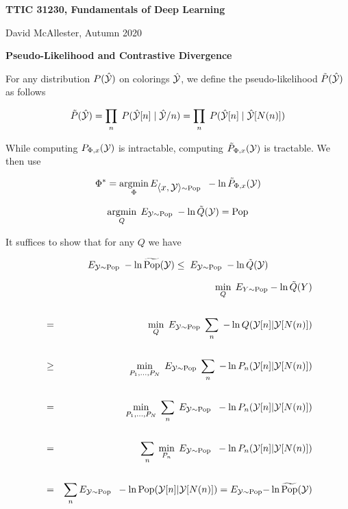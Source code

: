 




{\Huge

  \centerline{\bf TTIC 31230, Fundamentals of Deep Learning}
  \bigskip
  \centerline{David McAllester, Autumn 2020}
  \vfill
  \vfill
  \centerline{\bf Pseudo-Likelihood and Contrastive Divergence}
\vfill
\vfill
\vfill


For any distribution $P(\hat{\cal Y})$ on colorings $\hat{\cal Y}$,
we define the {\color{red} pseudo-likelihood}  $\tilde{P}(\hat{\cal Y})$ as follows

{\color{red} $$\tilde{P}(\hat{\cal Y}) = \prod_n\;P(\hat{\cal Y}[n]\;|\; \hat{\cal Y}/n) = \prod_n\;P(\hat{\cal Y}[n]\;|\; \hat{\cal Y}[N(n)])$$}

\vfill
While computing $P_{\Phi,x}({\cal Y})$ is intractable, computing $\tilde{P}_{\Phi,x}({\cal Y})$ is tractable.  We then use

{\color{red} $$\Phi^* = \operatorname*{argmin}_\Phi E_{{\mbox{$\langle x,{\cal Y}\rangle$}} \sim \mathrm{Pop}}\;\;-\ln \tilde{P}_{\Phi,x}({\cal Y})$$}


{\color{red} $$\operatorname*{argmin}_Q \; E_{{\cal Y} \sim \mathrm{Pop}} \;-\ln \tilde{Q}({\cal Y}) = \mathrm{Pop}$$}

\vfill
It suffices to show that for any $Q$ we have

\vfill
$$ E_{{\cal Y} \sim \mathrm{Pop}}\;-\ln \widetilde{\mathrm{Pop}}({\cal Y}) \leq \;E_{{\cal Y} \sim \mathrm{Pop}}\;-\ln \tilde{Q}({\cal Y})$$


{\huge
\begin{eqnarray*}
  & & \min_Q \;E_{Y\sim \mathrm{Pop}} -\ln \tilde{Q}(Y) \\
  \\
  & = & \min_Q \;E_{{\cal Y}\sim \mathrm{Pop}} \;\sum_n\;-\ln Q({\cal Y}[n]|{\cal Y}[N(n)]) \\
  \\
  & \geq & \min_{P_1,\ldots,P_N} \;E_{{\cal Y}\sim \mathrm{Pop}} \;\sum_n\;-\ln P_n({\cal Y}[n]|{\cal Y}[N(n)]) \\
  \\
  & = & \min_{P_1,\ldots,P_N} \;\sum_n \;E_{{\cal Y} \sim \mathrm{Pop}}\;\; -\ln P_n({\cal Y}[n]|{\cal Y}[N(n)]) \\
  \\          
  & = & \sum_n \;\min_{P_n}\;E_{{\cal Y} \sim \mathrm{Pop}}\;\; -\ln P_n({\cal Y}[n]|{\cal Y}[N(n)]) \\
  \\
    & = & \sum_n E_{{\cal Y} \sim \mathrm{Pop}}\;\; -\ln \mathrm{Pop}({\cal Y}[n]|{\cal Y}[N(n)]) =  E_{{\cal Y} \sim \mathrm{Pop}}{-\ln \widetilde{\mathrm{Pop}}({\cal Y})}
\end{eqnarray*}
}

}
